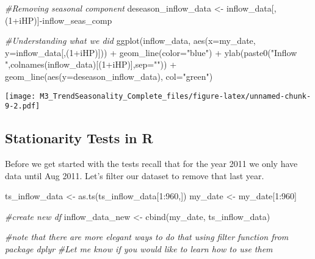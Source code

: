 \documentclass[
]{article}
\newenvironment{Shaded}{\begin{snugshade}}{\end{snugshade}}
\newcommand{\AttributeTok}[1]{\textcolor[rgb]{0.77,0.63,0.00}{#1}}
\newcommand{\CommentTok}[1]{\textcolor[rgb]{0.56,0.35,0.01}{\textit{#1}}}
\newcommand{\DecValTok}[1]{\textcolor[rgb]{0.00,0.00,0.81}{#1}}
\newcommand{\FunctionTok}[1]{\textcolor[rgb]{0.00,0.00,0.00}{#1}}
\newcommand{\NormalTok}[1]{#1}
\newcommand{\OtherTok}[1]{\textcolor[rgb]{0.56,0.35,0.01}{#1}}
\newcommand{\SpecialCharTok}[1]{\textcolor[rgb]{0.00,0.00,0.00}{#1}}
\newcommand{\StringTok}[1]{\textcolor[rgb]{0.31,0.60,0.02}{#1}}
\begin{document}
\begin{Shaded}
\begin{Highlighting}[]
\CommentTok{\#Removing seasonal component}
\NormalTok{deseason\_inflow\_data }\OtherTok{\textless{}{-}}\NormalTok{ inflow\_data[,(}\DecValTok{1}\SpecialCharTok{+}\NormalTok{iHP)]}\SpecialCharTok{{-}}\NormalTok{inflow\_seas\_comp}

\CommentTok{\#Understanding what we did}
\FunctionTok{ggplot}\NormalTok{(inflow\_data, }\FunctionTok{aes}\NormalTok{(}\AttributeTok{x=}\NormalTok{my\_date, }\AttributeTok{y=}\NormalTok{inflow\_data[,(}\DecValTok{1}\SpecialCharTok{+}\NormalTok{iHP)])) }\SpecialCharTok{+}
            \FunctionTok{geom\_line}\NormalTok{(}\AttributeTok{color=}\StringTok{"blue"}\NormalTok{) }\SpecialCharTok{+}
            \FunctionTok{ylab}\NormalTok{(}\FunctionTok{paste0}\NormalTok{(}\StringTok{"Inflow "}\NormalTok{,}\FunctionTok{colnames}\NormalTok{(inflow\_data)[(}\DecValTok{1}\SpecialCharTok{+}\NormalTok{iHP)],}\AttributeTok{sep=}\StringTok{""}\NormalTok{)) }\SpecialCharTok{+}
            \FunctionTok{geom\_line}\NormalTok{(}\FunctionTok{aes}\NormalTok{(}\AttributeTok{y=}\NormalTok{deseason\_inflow\_data), }\AttributeTok{col=}\StringTok{"green"}\NormalTok{)}
\end{Highlighting}
\end{Shaded}

\texttt{[image: M3\_TrendSeasonality\_Complete\_files/figure-latex/unnamed-chunk-9-2.pdf]}

\hypertarget{stationarity-tests-in-r}{%
\subsection{Stationarity Tests in R}\label{stationarity-tests-in-r}}

Before we get started with the tests recall that for the year 2011 we
only have data until Aug 2011. Let's filter our dataset to remove that
last year.

\begin{Shaded}
\begin{Highlighting}[]
\NormalTok{ts\_inflow\_data }\OtherTok{\textless{}{-}} \FunctionTok{as.ts}\NormalTok{(ts\_inflow\_data[}\DecValTok{1}\SpecialCharTok{:}\DecValTok{960}\NormalTok{,])}
\NormalTok{my\_date }\OtherTok{\textless{}{-}}\NormalTok{ my\_date[}\DecValTok{1}\SpecialCharTok{:}\DecValTok{960}\NormalTok{]}

\CommentTok{\#create new df}
\NormalTok{inflow\_data\_new }\OtherTok{\textless{}{-}} \FunctionTok{cbind}\NormalTok{(my\_date, ts\_inflow\_data)}

\CommentTok{\#note that there are more elegant ways to do that using filter function from package dplyr}
\CommentTok{\#Let me know if you would like to learn how to use them}
\end{Highlighting}
\end{Shaded}
\end{document}
